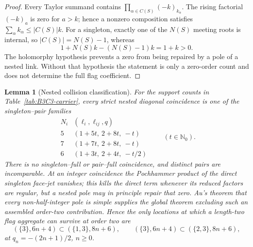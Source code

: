 \documentclass[11pt]{article}
\newtheorem{lemma}[theorem]{Lemma}
\renewcommand{\boxed}[1]{#1}
\newcommand{\Nzero}{\mathbb N_0}
\begin{document}
\begin{proof}
Every Taylor summand contains
\(\prod_{\alpha\in C(S)}(-k)_{k_\alpha}\).  The rising factorial
\((-k)_a\) is zero for \(a>k\); hence a nonzero composition satisfies
\(\sum_\alpha k_\alpha\le |C(S)|k\).  For a singleton, exactly one of
the \(N(S)\) meeting roots is internal, so
\(|C(S)|=N(S)-1\), whereas
\[
 1+N(S)k-(N(S)-1)k=1+k>0.
\]
The holomorphy hypothesis prevents a zero from being repaired by a pole
of a nested link.  Without that hypothesis the statement is only a
zero-order count and does not determine the full flag coefficient.
\end{proof}

\begin{lemma}[Nested collision classification]
\label{lem:B3C3-collisions}
For the support counts in Table~\ref{tab:B3C3-carrier}, every strict
nested diagonal coincidence is one of the singleton--pair families
\[
\begin{array}{c|c}
N_i & (\ell_i,\ell_{ij},q)\\
\hline
5 & (1+5t,\ 2+8t,\ -t)\\
7 & (1+7t,\ 2+8t,\ -t)\\
6 & (1+3t,\ 2+4t,\ -t/2)
\end{array}
\qquad(t\in\Nzero).
\]
There is no singleton--full or pair--full coincidence, and distinct
pairs are incomparable.  At an integer coincidence the Pochhammer
product of the direct singleton face-jet vanishes; this kills the direct
term whenever its reduced factors are regular, but a nested pole may in
principle repair that zero.  Au's theorem that every non-half-integer
pole is simple supplies the global theorem excluding such an assembled
order-two contribution.  Hence the only locations at which a
length-two flag aggregate can survive at order two are
\begin{equation}\label{eq:B3C3-negative-flags}
\boxed{
 (\{3\},6n+4)\subset(\{1,3\},8n+6),\qquad
 (\{3\},6n+4)\subset(\{2,3\},8n+6),}
\end{equation}
at \(q_n=-(2n+1)/2\), \(n\ge0\).
\end{lemma}
\end{document}
